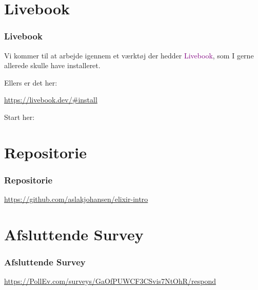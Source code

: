 \section{Livebook}
\begin{frame}
    \frametitle{Livebook}
    \vspace{5mm}
    Vi kommer til at arbejde igennem et værktøj der hedder \textcolor{purple}{Livebook}, som I gerne allerede skulle have installeret.
    
    \vspace{7mm}
    Ellers er det her:
    \begin{center}
      \url{https://livebook.dev/\#install}
    \end{center}
    
    \vspace{7mm}
    Start her:
    \begin{center}
    \end{center}
\end{frame}

\section{Repositorie}
\begin{frame}
    \frametitle{Repositorie}
    \begin{center}
      
      \vspace{4mm}
      \url{https://github.com/aslakjohansen/elixir-intro}
    \end{center}
\end{frame}

\section{Afsluttende Survey}
\begin{frame}
    \frametitle{Afsluttende Survey}
    \begin{center}
      
      \vspace{4mm}
      \url{https://PollEv.com/surveys/GaOfPUWCF3CSvis7NtOhR/respond}
    \end{center}
\end{frame}

